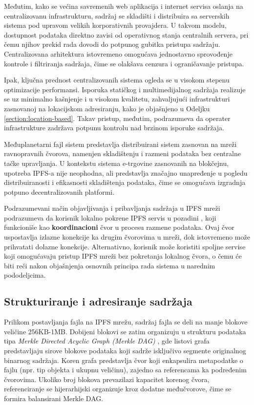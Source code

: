 Međutim, kako se većina savremenih web aplikacija i internet servisa oslanja na centralizovanu infrastrukturu, sadržaj se skladišti i distribuira sa serverskih sistema pod upravom velikih korporativnih provajdera. U takvom modelu, dostupnost podataka direktno zavisi od operativnog stanja centralnih servera, pri čemu njihov prekid rada dovodi do potpunog gubitka pristupa sadržaju. Centralizovana arhitektura istovremeno omogućava jednostavno sprovođenje kontrole i filtriranja sadržaja, čime se olakšava cenzura i ograničavanje pristupa.

Ipak, ključna prednost centralizovanih sistema ogleda se u visokom stepenu optimizacije performansi. Isporuka statičkog i multimedijalnog sadržaja realizuje se uz minimalno kašnjenje i u visokom kvalitetu, zahvaljujući infrastrukturi zasnovanoj na lokacijskom adresiranju, kako je objašnjeno u Odeljku \ref{section:location-based}. Takav pristup, međutim, podrazumeva da operater infrastrukture zadržava potpunu kontrolu nad brzinom isporuke sadržaja.

Međuplanetarni fajl sistem  \cite{benet2014ipfs} predstavlja distribuirani sistem zasnovan na mreži ravnopravnih čvorova, namenjen skladištenju i razmeni podataka bez centralne tačke upravljanja. U kontekstu sistema e-trgovine zasnovanih na blokčejnu, upotreba IPFS-a nije neophodna, ali predstavlja značajno unapređenje u pogledu distribuiranosti i efikasnosti skladištenja podataka, čime se omogućava izgradnja potpuno decentralizovanih platformi.

Podrazumevani način objavljivanja i pribavljanja sadržaja u IPFS mreži podrazumeva da korisnik lokalno pokrene IPFS servis u pozadini , koji funkcioniše kao \textbf{koordinacioni} čvor u procesu razmene podataka. Ovaj čvor uspostavlja izlazne  konekcije ka drugim čvorovima u mreži, dok istovremeno može prihvatati dolazne  konekcije. Alternativno, korisnik može koristiti spoljne servise koji omogućavaju pristup IPFS mreži bez pokretanja lokalnog čvora, o čemu će biti reči nakon objašnjenja osnovnih principa rada sistema u narednim pododeljcima.

\subsection{Strukturiranje i adresiranje sadržaja}
Prilikom postavljanja fajla na IPFS mrežu, sadržaj fajla se deli na manje blokove veličine 256KB-1MB. Dobijeni blokovi se zatim organizuju u strukturu podataka tipa \textit{Merkle Directed Acyclic Graph (Merkle DAG)} \cite{sanjuan2020merkle}, gde listovi grafa predstavljaju sirove blokove podataka koji sadrže isključivo segmente originalnog binarnog sadržaja. Koren grafa predstavlja čvor koji enkapsulira metapodatke o fajlu (npr. tip objekta i ukupnu veličinu), zajedno sa referencama ka podređenim čvorovima. Ukoliko broj blokova prevazilazi kapacitet korenog čvora, referenciranje se hijerarhijski organizuje kroz dodatne međučvorove, čime se formira balansirani Merkle DAG.

